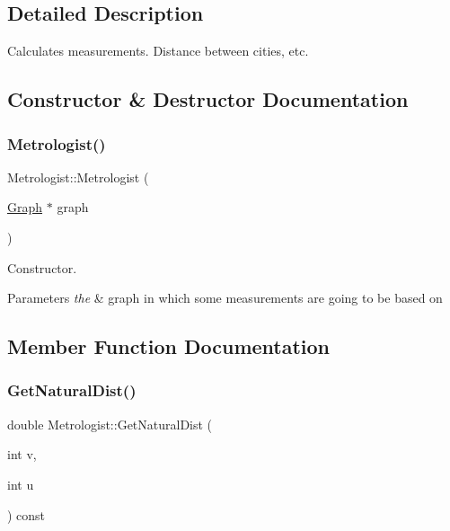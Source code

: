 \subsection{Detailed Description}
Calculates measurements. Distance between cities, etc. 

\subsection{Constructor \& Destructor Documentation}
\mbox{\label{classMetrologist_a9c7df984dd6e43cd827ca327fd2ca970}} 
\subsubsection{\texorpdfstring{Metrologist()}{Metrologist()}}
{\footnotesize\ttfamily Metrologist\+::\+Metrologist (\begin{DoxyParamCaption}\item[{\hyperlink{classGraph}{Graph} $\ast$}]{graph }\end{DoxyParamCaption})}



Constructor. 


\begin{DoxyParams}{Parameters}
{\em the} & graph in which some measurements are going to be based on \\
\hline
\end{DoxyParams}


\subsection{Member Function Documentation}
\mbox{\label{classMetrologist_aa3347f4157d92bf1fcac54c559d0486e}} 
\subsubsection{\texorpdfstring{Get\+Natural\+Dist()}{GetNaturalDist()}}
{\footnotesize\ttfamily double Metrologist\+::\+Get\+Natural\+Dist (\begin{DoxyParamCaption}\item[{int}]{v,  }\item[{int}]{u }\end{DoxyParamCaption}) const}



